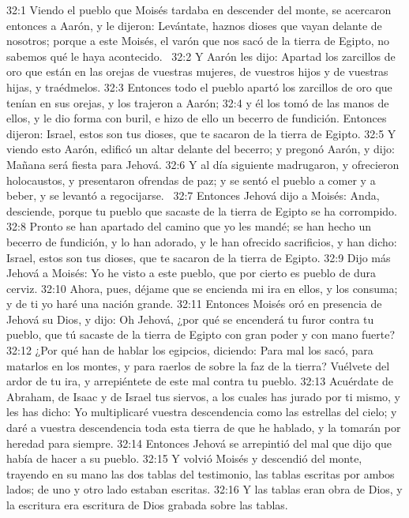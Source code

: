 32:1 Viendo el pueblo que Moisés tardaba en descender del monte, se acercaron entonces a Aarón, y le dijeron: Levántate, haznos dioses que vayan delante de nosotros; porque a este Moisés, el varón que nos sacó de la tierra de Egipto, no sabemos qué le haya acontecido.  
32:2 Y Aarón les dijo: Apartad los zarcillos de oro que están en las orejas de vuestras mujeres, de vuestros hijos y de vuestras hijas, y traédmelos. 
32:3 Entonces todo el pueblo apartó los zarcillos de oro que tenían en sus orejas, y los trajeron a Aarón; 
32:4 y él los tomó de las manos de ellos, y le dio forma con buril, e hizo de ello un becerro de fundición. Entonces dijeron: Israel, estos son tus dioses, que te sacaron de la tierra de Egipto. 
32:5 Y viendo esto Aarón, edificó un altar delante del becerro; y pregonó Aarón, y dijo: Mañana será fiesta para Jehová. 
32:6 Y al día siguiente madrugaron, y ofrecieron holocaustos, y presentaron ofrendas de paz; y se sentó el pueblo a comer y a beber, y se levantó a regocijarse.  
32:7 Entonces Jehová dijo a Moisés: Anda, desciende, porque tu pueblo que sacaste de la tierra de Egipto se ha corrompido. 
32:8 Pronto se han apartado del camino que yo les mandé; se han hecho un becerro de fundición, y lo han adorado, y le han ofrecido sacrificios, y han dicho: Israel, estos son tus dioses, que te sacaron de la tierra de Egipto. 
32:9 Dijo más Jehová a Moisés: Yo he visto a este pueblo, que por cierto es pueblo de dura cerviz. 
32:10 Ahora, pues, déjame que se encienda mi ira en ellos, y los consuma; y de ti yo haré una nación grande. 
32:11 Entonces Moisés oró en presencia de Jehová su Dios, y dijo: Oh Jehová, ¿por qué se encenderá tu furor contra tu pueblo, que tú sacaste de la tierra de Egipto con gran poder y con mano fuerte? 
32:12 ¿Por qué han de hablar los egipcios, diciendo: Para mal los sacó, para matarlos en los montes, y para raerlos de sobre la faz de la tierra? Vuélvete del ardor de tu ira, y arrepiéntete de este mal contra tu pueblo. 
32:13 Acuérdate de Abraham, de Isaac y de Israel tus siervos, a los cuales has jurado por ti mismo, y les has dicho: Yo multiplicaré vuestra descendencia como las estrellas del cielo; y daré a vuestra descendencia toda esta tierra de que he hablado, y la tomarán por heredad para siempre. 
32:14 Entonces Jehová se arrepintió del mal que dijo que había de hacer a su pueblo. 
32:15 Y volvió Moisés y descendió del monte, trayendo en su mano las dos tablas del testimonio, las tablas escritas por ambos lados; de uno y otro lado estaban escritas. 
32:16 Y las tablas eran obra de Dios, y la escritura era escritura de Dios grabada sobre las tablas. 
